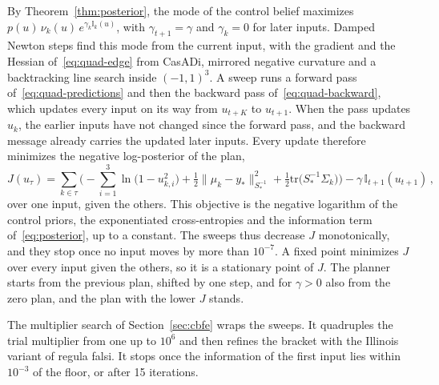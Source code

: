 \documentclass{l4dc2027}
\def\tr{\text{tr}}
\begin{document}
By Theorem~\ref{thm:posterior}, the mode of the control belief maximizes $p(u)\, \nu_k(u)\, e^{\gamma_k \mathbb{I}_k(u)}$, with $\gamma_{t+1} = \gamma$ and $\gamma_k = 0$ for later inputs. Damped Newton steps find this mode from the current input, with the gradient and the Hessian of~\eqref{eq:quad-edge} from CasADi, mirrored negative curvature and a backtracking line search inside $(-1, 1)^3$. A sweep runs a forward pass of~\eqref{eq:quad-predictions} and then the backward pass of~\eqref{eq:quad-backward}, which updates every input on its way from $u_{t+K}$ to $u_{t+1}$. When the pass updates $u_k$, the earlier inputs have not changed since the forward pass, and the backward message already carries the updated later inputs. Every update therefore minimizes the negative log-posterior of the plan,
\begin{equation}\label{eq:quad-objective}
	J(u_\tau) = \sum_{k \in \tau} \Big( -\sum_{i=1}^{3} \ln\big(1 - u_{k,i}^2\big) + \tfrac{1}{2}\|\mu_k - y_*\|^2_{S_*^{-1}} + \tfrac{1}{2}\tr\big(S_*^{-1} \Sigma_k\big) \Big) - \gamma\, \mathbb{I}_{t+1}(u_{t+1}) \, ,
\end{equation}
over one input, given the others. This objective is the negative logarithm of the control priors, the exponentiated cross-entropies and the information term of~\eqref{eq:posterior}, up to a constant. The sweeps thus decrease $J$ monotonically, and they stop once no input moves by more than $10^{-7}$. A fixed point minimizes $J$ over every input given the others, so it is a stationary point of $J$. The planner starts from the previous plan, shifted by one step, and for $\gamma > 0$ also from the zero plan, and the plan with the lower $J$ stands.

The multiplier search of Section~\ref{sec:cbfe} wraps the sweeps. It quadruples the trial multiplier from one up to $10^6$ and then refines the bracket with the Illinois variant of regula falsi. It stops once the information of the first input lies within $10^{-3}$ of the floor, or after 15 iterations.
\end{document}
